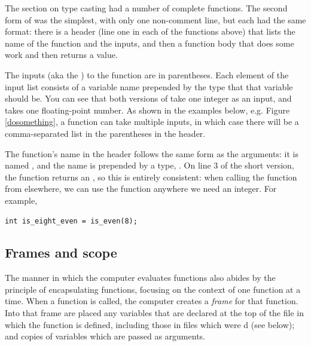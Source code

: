 \documentclass[12pt]{article}
\begin{document}
The section on type casting had a number of complete functions. The
second form of  was the simplest, with only one 
non-comment line, but each had the same format: there is a header (line
one in each of the functions above) that lists the name of the function
and the inputs, and then a function body that does some work and then
returns a value.

The inputs (aka the ) to the function
are in parentheses. Each element of the input
list consists of a variable name prepended by the type that that
variable should be. You can see that both versions of 
take one integer as an input, and
 takes one floating-point number.
As shown in the examples below, e.g. Figure \ref{dosomething}, a
function can take multiple inputs, in which case there will be a
comma-separated list in the parentheses in the header.

The function's name in the header follows the same form as the arguments:
it is named , and the name is prepended by a type,
.  On line 3 of the short version, the function returns
an , so this is entirely consistent: when calling the
function from elsewhere, we can use the function anywhere we need an
integer. For example,
\begin{lstlisting}
int is_eight_even = is_even(8);
\end{lstlisting}




\subsection{Frames and scope}  
The manner in which the computer evaluates functions also abides by the
principle of encapsulating functions, focusing on the context of one
function at a time. When a function is called, the computer creates a
{\sl frame} for that function. Into that frame are placed any variables
that are declared at the top of the file in which the function is defined,
including those in files which were d (see below); and copies of
variables which are passed as arguments. 
\end{document}
